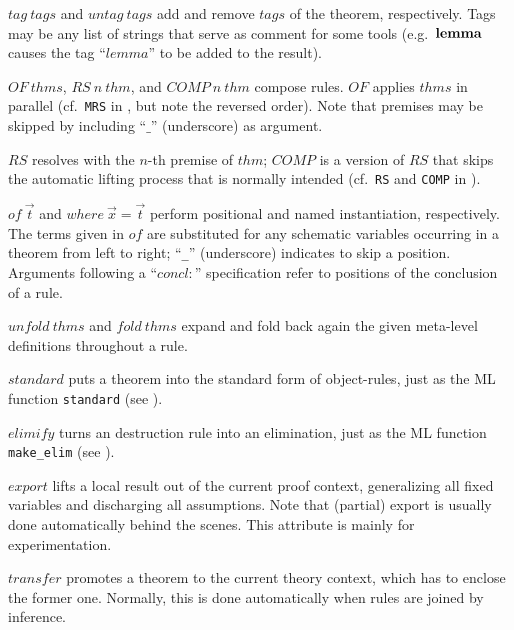 \begin{descr}
\item [$tag~tags$ and $untag~tags$] add and remove $tags$ of the theorem,
  respectively.  Tags may be any list of strings that serve as comment for
  some tools (e.g.\ ${\mathord{\mathbf{lemma}}}$ causes the tag ``$lemma$'' to be added to the
  result).
\item [$OF~thms$, $RS~n~thm$, and $COMP~n~thm$] compose rules.  $OF$ applies
  $thms$ in parallel (cf.\ \texttt{MRS} in \cite[\S5]{isabelle-ref}, but note
  the reversed order).  Note that premises may be skipped by including
  ``$\_$'' (underscore) as argument.
  
  $RS$ resolves with the $n$-th premise of $thm$; $COMP$ is a version of $RS$
  that skips the automatic lifting process that is normally intended (cf.\ 
  \texttt{RS} and \texttt{COMP} in \cite[\S5]{isabelle-ref}).
  
\item [$of~\vec t$ and $where~\vec x = \vec t$] perform positional and named
  instantiation, respectively.  The terms given in $of$ are substituted for
  any schematic variables occurring in a theorem from left to right;
  ``\texttt{_}'' (underscore) indicates to skip a position.  Arguments
  following a ``$concl\colon$'' specification refer to positions of the
  conclusion of a rule.
  
\item [$unfold~thms$ and $fold~thms$] expand and fold back again the given
  meta-level definitions throughout a rule.
 
\item [$standard$] puts a theorem into the standard form of object-rules, just
  as the ML function \texttt{standard} (see \cite[\S5]{isabelle-ref}).
  
\item [$elimify$] turns an destruction rule into an elimination, just as the
  ML function \texttt{make\_elim} (see \cite{isabelle-ref}).
  
\item [$export$] lifts a local result out of the current proof context,
  generalizing all fixed variables and discharging all assumptions.  Note that
  (partial) export is usually done automatically behind the scenes.  This
  attribute is mainly for experimentation.
  
\item [$transfer$] promotes a theorem to the current theory context, which has
  to enclose the former one.  Normally, this is done automatically when rules
  are joined by inference.

\end{descr}


